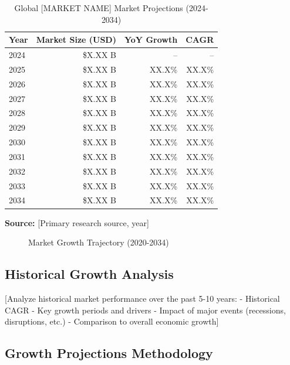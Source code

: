 \documentclass[11pt,letterpaper]{report}
\newcommand{\reporttitle}{[MARKET NAME]}
\begin{document}
\begin{table}[htbp]
\centering
\caption{Global \reporttitle{} Market Projections (2024-2034)}
\begin{tabular}{@{}lrrr@{}}
\toprule
\textbf{Year} & \textbf{Market Size (USD)} & \textbf{YoY Growth} & \textbf{CAGR} \\
\midrule
2024 & \$X.XX B & -- & -- \\
\rowcolor{tablealt} 2025 & \$X.XX B & XX.X\% & XX.X\% \\
2026 & \$X.XX B & XX.X\% & XX.X\% \\
\rowcolor{tablealt} 2027 & \$X.XX B & XX.X\% & XX.X\% \\
2028 & \$X.XX B & XX.X\% & XX.X\% \\
\rowcolor{tablealt} 2029 & \$X.XX B & XX.X\% & XX.X\% \\
2030 & \$X.XX B & XX.X\% & XX.X\% \\
\rowcolor{tablealt} 2031 & \$X.XX B & XX.X\% & XX.X\% \\
2032 & \$X.XX B & XX.X\% & XX.X\% \\
\rowcolor{tablealt} 2033 & \$X.XX B & XX.X\% & XX.X\% \\
2034 & \$X.XX B & XX.X\% & XX.X\% \\
\bottomrule
\end{tabular}
\label{tab:tam_projections}
\end{table}

\textbf{Source:} [Primary research source, year]

\begin{figure}[htbp]
\centering
\caption{Market Growth Trajectory (2020-2034)}
\label{fig:market_growth}
\end{figure}

\subsection{Historical Growth Analysis}

[Analyze historical market performance over the past 5-10 years:
- Historical CAGR
- Key growth periods and drivers
- Impact of major events (recessions, disruptions, etc.)
- Comparison to overall economic growth]

\subsection{Growth Projections Methodology}
\end{document}
